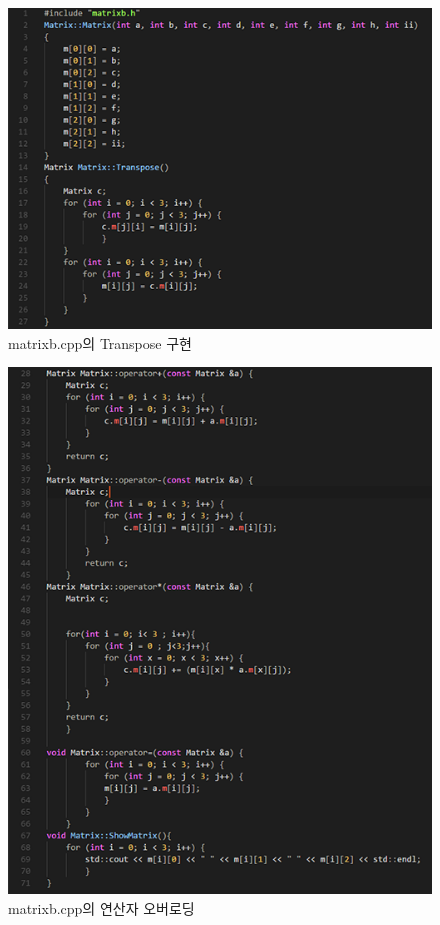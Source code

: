 \documentclass[a4paper,12pt]{article}
\begin{document}
\newpage
\begin{figure}[t]\vspace*{4pt} 
\centerline{\includegraphics[width=1.0\columnwidth]{btrans}} 
\caption{matrixb.cpp의 Transpose 구현}\vspace*{-6pt} 
\label{figure:matrixb} 
\end{figure} 

\begin{figure}[t]\vspace*{4pt} 
\centerline{\includegraphics[width=1.0\columnwidth]{bother}} 
\caption{matrixb.cpp의 연산자 오버로딩}\vspace*{-6pt} 
\label{figure:matrixb_overload} 
\end{figure} 
\end{document}
